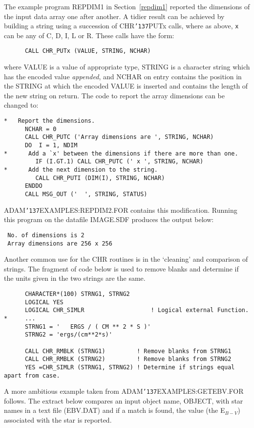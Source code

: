 \documentclass[twoside,11pt]{article}
\renewcommand{\_}{{\tt\char'137}}
\begin{document}
The example program REPDIM1 in Section~\ref{repdim1} reported the dimensions of
the input data array one after another.
A tidier result can be achieved by building a  string using a succession of
CHR\_PUTx calls, where as above, {\tt x} can be any of C, D, I, L or  R.
These calls have the form:
\begin{verbatim}
      CALL CHR_PUTx (VALUE, STRING, NCHAR)
\end{verbatim}
where VALUE is a value of appropriate type, STRING is a character string which
has the encoded value {\sl appended},  and NCHAR on entry contains the
position in the STRING at which the encoded VALUE is inserted and contains
the length of the new string on return.
The code to report the array dimensions can be changed to:
\begin{verbatim}
*   Report the dimensions.
      NCHAR = 0
      CALL CHR_PUTC ('Array dimensions are ', STRING, NCHAR)
      DO  I = 1, NDIM
*      Add a `x' between the dimensions if there are more than one.
         IF (I.GT.1) CALL CHR_PUTC (' x ', STRING, NCHAR)
*      Add the next dimension to the string.
         CALL CHR_PUTI (DIM(I), STRING, NCHAR)
      ENDDO
      CALL MSG_OUT ('  ', STRING, STATUS)
\end{verbatim}
ADAM\_EXAMPLES:REPDIM2.FOR contains this modification.
Running this program on the datafile IMAGE.SDF produces the output below:
\begin{verbatim}
 No. of dimensions is 2
 Array dimensions are 256 x 256
\end{verbatim}
Another common use for the CHR routines is in the `cleaning' and
comparison  of strings.
The fragment of code below is used to remove blanks and
determine if the units given in the two strings are the same.
\begin{verbatim}
      CHARACTER*(100) STRNG1, STRNG2
      LOGICAL YES
      LOGICAL CHR_SIMLR                   ! Logical external Function.
*     ...
      STRNG1 = '   ERGS / ( CM ** 2 * S )'
      STRNG2 = 'ergs/(cm**2*s)'

      CALL CHR_RMBLK (STRNG1)         ! Remove blanks from STRNG1
      CALL CHR_RMBLK (STRNG2)         ! Remove blanks from STRNG2
      YES =CHR_SIMLR (STRNG1, STRNG2) ! Determine if strings equal apart from case.
\end{verbatim}
\newpage
A more ambitious example taken from ADAM\_EXAMPLES:GETEBV.FOR follows.
The  extract below compares an input object name, OBJECT,
with star names
in a text file (EBV.DAT) and if a match is found, the
value (the E$_{B-V}$) associated with the star is reported.
\end{document}
